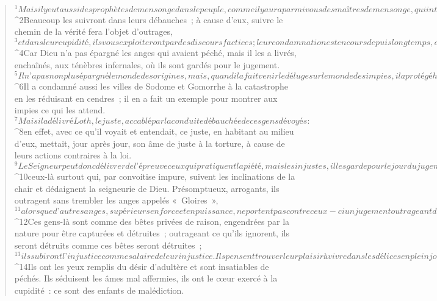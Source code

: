          
      \bchapter{}
      \begin{verse}
${}^{1}Mais il y eut aussi des prophètes de mensonge dans le peuple, comme il y aura parmi vous des maîtres de mensonge, qui introduiront des hérésies menant à la perdition et renieront le Maître souverain qui les a rachetés. Ils préparent pour bientôt leur perdition. 
${}^{2}Beaucoup les suivront dans leurs débauches ; à cause d’eux, suivre le chemin de la vérité fera l’objet d’outrages, 
${}^{3}et dans leur cupidité, ils vous exploiteront par des discours factices ; leur condamnation est en cours depuis longtemps, et leur perdition n’est pas en sommeil.
${}^{4}Car Dieu n’a pas épargné les anges qui avaient péché, mais il les a livrés, enchaînés, aux ténèbres infernales, où ils sont gardés pour le jugement. 
${}^{5}Il n’a pas non plus épargné le monde des origines, mais, quand il a fait venir le déluge sur le monde des impies, il a protégé huit personnes, dont Noé qui proclamait la justice. 
${}^{6}Il a condamné aussi les villes de Sodome et Gomorrhe à la catastrophe en les réduisant en cendres ; il en a fait un exemple pour montrer aux impies ce qui les attend. 
${}^{7}Mais il a délivré Loth, le juste, accablé par la conduite débauchée de ces gens dévoyés : 
${}^{8}en effet, avec ce qu’il voyait et entendait, ce juste, en habitant au milieu d’eux, mettait, jour après jour, son âme de juste à la torture, à cause de leurs actions contraires à la loi. 
${}^{9}Le Seigneur peut donc délivrer de l’épreuve ceux qui pratiquent la piété, mais les injustes, il les garde pour le jour du jugement afin de les punir, 
${}^{10}ceux-là surtout qui, par convoitise impure, suivent les inclinations de la chair et dédaignent la seigneurie de Dieu. Présomptueux, arrogants, ils outragent sans trembler les anges appelés « Gloires », 
${}^{11}alors que d’autres anges, supérieurs en force et en puissance, ne portent pas contre ceux-ci un jugement outrageant de la part du Seigneur.
${}^{12}Ces gens-là sont comme des bêtes privées de raison, engendrées par la nature pour être capturées et détruites ; outrageant ce qu’ils ignorent, ils seront détruits comme ces bêtes seront détruites ; 
${}^{13}ils subiront l’injustice comme salaire de leur injustice. Ils pensent trouver leur plaisir à vivre dans les délices en plein jour, ils ne sont que taches et défauts, en se délectant de leurs tromperies quand ils font bombance avec vous. 
${}^{14}Ils ont les yeux remplis du désir d’adultère et sont insatiables de péchés. Ils séduisent les âmes mal affermies, ils ont le cœur exercé à la cupidité : ce sont des enfants de malédiction. 

\end{verse}

